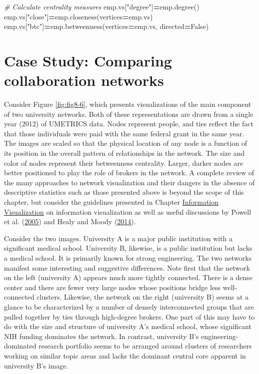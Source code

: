 \documentclass[]{krantz}
\newenvironment{Shaded}{\begin{snugshade}}{\end{snugshade}}
\newcommand{\StringTok}[1]{\textcolor[rgb]{0.31,0.60,0.02}{#1}}
\newcommand{\CommentTok}[1]{\textcolor[rgb]{0.56,0.35,0.01}{\textit{#1}}}
\newcommand{\VariableTok}[1]{\textcolor[rgb]{0.00,0.00,0.00}{#1}}
\newcommand{\OperatorTok}[1]{\textcolor[rgb]{0.81,0.36,0.00}{\textbf{#1}}}
\newcommand{\NormalTok}[1]{#1}
\begin{document}
\begin{Shaded}
\begin{Highlighting}[]
\CommentTok{# Calculate centrality measures}
\NormalTok{emp.vs[}\StringTok{"degree"}\NormalTok{]}\OperatorTok{=}\NormalTok{emp.degree()}
\NormalTok{emp.vs[}\StringTok{"close"}\NormalTok{]}\OperatorTok{=}\NormalTok{emp.closeness(vertices}\OperatorTok{=}\NormalTok{emp.vs)}
\NormalTok{emp.vs[}\StringTok{"btc"}\NormalTok{]}\OperatorTok{=}\NormalTok{emp.betweenness(vertices}\OperatorTok{=}\NormalTok{emp.vs, directed}\OperatorTok{=}\VariableTok{False}\NormalTok{)}
\end{Highlighting}
\end{Shaded}

\section{Case Study: Comparing collaboration
networks}\label{case-study-comparing-collaboration-networks}

Consider Figure \ref{fig:fig8-6}, which presents visualizations of the
main component of two university networks. Both of these representations
are drawn from a single year (2012) of UMETRICS data. Nodes represent
people, and ties reflect the fact that those individuals were paid with
the same federal grant in the same year. The images are scaled so that
the physical location of any node is a function of its position in the
overall pattern of relationships in the network. The size and color of
nodes represent their betweenness centrality. Larger, darker nodes are
better positioned to play the role of brokers in the network. A complete
review of the many approaches to network visualization and their dangers
in the absence of descriptive statistics such as those presented above
is beyond the scope of this chapter, but consider the guidelines
presented in Chapter \protect\hyperlink{chap:viz}{Information
Visualization} on information visualization as well as useful
discussions by Powell et al.
(\protect\hyperlink{ref-powell2005network}{2005}) and Healy and Moody
(\protect\hyperlink{ref-healy2014data}{2014}).

Consider the two images. University A is a major public institution with
a significant medical school. University B, likewise, is a public
institution but lacks a medical school. It is primarily known for strong
engineering. The two networks manifest some interesting and suggestive
differences. Note first that the network on the left (university A)
appears much more tightly connected. There is a dense center and there
are fewer very large nodes whose positions bridge less well-connected
clusters. Likewise, the network on the right (university B) seems at a
glance to be characterized by a number of densely interconnected groups
that are pulled together by ties through high-degree brokers. One part
of this may have to do with the size and structure of university A's
medical school, whose significant NIH funding dominates the network. In
contrast, university B's engineering-dominated research portfolio seems
to be arranged around clusters of researchers working on similar topic
areas and lacks the dominant central core apparent in university B's
image.
\end{document}
